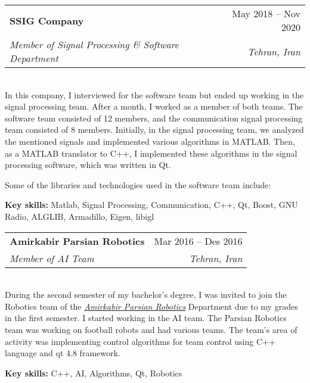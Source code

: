 \documentclass[a4paper,11pt]{article}
\makeatletter
\newcommand{\resumeItem}[1]{
\item{\small{#1}}
}
\newcommand{\resumeItemListStart}{\begin{itemize}[rightmargin=0.11in]}
\newcommand{\resumeItemListEnd}{\end{itemize}}
\newcommand{\resumeQuadHeading}[4]{
\item
\begin{tabular*}{0.96\textwidth}[t]{l@{\extracolsep{\fill}}r}
\textbf{#1} & #2 \\
\textit{\small#3} & \textit{\small #4} \\
\end{tabular*}
}
\makeatother
\begin{document}
\resumeQuadHeading{SSIG Company}{May 2018 -- Nov 2020}
{Member of Signal Processing \& Software Department}{Tehran, Iran}\\
In this company, I interviewed for the software team but ended up working in the signal processing team. After a month, I worked as a member of both teams. The software team consisted of 12 members, and the communication signal processing team consisted of 8 members. Initially, in the signal processing team, we analyzed the mentioned signals and implemented various algorithms in MATLAB. Then, as a MATLAB translator to C++, I implemented these algorithms in the signal processing software, which was written in Qt.

Some of the libraries and technologies used in the software team include:


\textbf{Key skills:} Matlab, Signal Processing, Communication, C++, Qt, Boost, GNU Radio, ALGLIB, Armadillo, Eigen, libigl



\resumeQuadHeading{Amirkabir Parsian Robotics}{Mar 2016 -- Des 2016}
{Member of AI Team}{Tehran, Iran}\\
During the second semester of my bachelor's degree, I was invited to join the Robotics team of the \href{http://www.parsianrobotics.aut.ac.ir/}{\textit{Amirkabir Parsian Robotics}} Department due to my grades in the first semester.
I started working in the AI team. The Parsian Robotics team was working on football robots and had various teams. The team's area of activity was implementing control algorithms for team control using C++ language and qt 4.8 framework.

\textbf{Key skills:} C++, AI, Algorithms, Qt, Robotics
\end{document}
